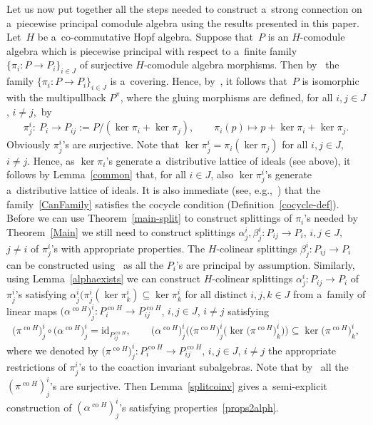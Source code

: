 \documentclass[11pt]{article}
\DeclareMathOperator{\co}{co}
\begin{document}
Let us now put together all the steps needed to construct a~strong connection on a~piecewise principal comodule algebra
using the results presented in this paper.
Let~$H$ be a~co-commutative Hopf algebra.
Suppose that~$P$ is an $H$-comodule algebra which is piecewise principal with respect to a~f\/inite family
$\{\pi_i:P\rightarrow P_i\}_{i\in J}$ of surjective $H$-comodule algebra morphisms.
Then by~\cite[Corollary~3.7]{hkmz11} the family $\{\pi_i:P\rightarrow P_i\}_{i\in J}$ is a~covering.
Hence, by~\cite[Proposition~3]{CM2000}, it follows that~$P$ is isomorphic with the multipullback $P^\pi$, where the
gluing morphisms are def\/ined, for all $i,j\in J$, $i\neq j$,~by
\begin{gather}
\label{CanFamily}
\pi^i_j: \ P_i\longrightarrow P_{ij}:=P/(\ker\pi_i+\ker\pi_j),
\qquad
\pi_i(p)\longmapsto p+\ker\pi_i+\ker\pi_j.
\end{gather}
Obviously $\pi^i_j$'s are surjective.
Note that $\ker\pi^i_j=\pi_i(\ker\pi_j)$ for all $i,j\in J$, $i\neq j$.
Hence, as $\ker\pi_i$'s generate a~distributive lattice of ideals (see above), it follows by Lemma~\ref{common} that,
for all $i\in J$, also $\ker\pi^i_j$'s generate a~distributive lattice of ideals.
It is also immediate (see, e.g.,~\cite[Remark~2]{CM2000}) that the family~\eqref{CanFamily} satisf\/ies the cocycle
condition (Def\/inition~\ref{cocycle-def}).
Before we can use Theorem~\ref{main-split} to construct splittings of $\pi_i$'s needed by Theorem~\ref{Main} we still
need to construct splittings $\alpha^i_j,\beta^i_j:P_{ij}\rightarrow P_i$, $i,j\in J$,
$j\neq i$ of $\pi^i_j$'s with appropriate properties.
The $H$-colinear splittings $\beta^i_j:P_{ij}\rightarrow P_i$ can be constructed using~\cite[Lemma~3.1]{hkmz11} as all
the $P_{i}$'s are principal by assumption.
Similarly, using Lemma~\ref{alphaexists} we can construct $H$-colinear splittings $\alpha^i_j:P_{ij}\rightarrow P_i$ of
$\pi^i_j$'s satisfying $\alpha^i_j(\pi^i_j(\ker{}\pi^i_k)\subseteq\ker\pi^i_k$ for all distinct $i,j,k\in J$ from
a~family of linear maps $\big(\alpha^{\co H}\big)^i_j:P_i^{\co H}\rightarrow P_{ij}^{\co H}$, $i,j\in J$, $i\neq j$ satisfying
\begin{gather}
\label{props2alph}
\big(\pi^{\co H}\big)^i_j\circ\big(\alpha^{\co H}\big)^i_j=\mathrm{id}_{P_{ij}^{\co H}},
\qquad
\big(\alpha^{\co H}\big)^i_j\big(\big(\pi^{\co H}\big)^i_j\big(\ker\big(\pi^{\co H}\big)^i_k\big)\big)\subseteq\ker\big(\pi^{\co H}\big)^i_k,
\end{gather}
where we denoted by $\big(\pi^{\co H}\big)^i_j:P_i^{\co H}\rightarrow P_{ij}^{\co H}$, $i,j\in J$, $i\neq j$
the appropriate restrictions of $\pi^i_j$'s to the coaction invariant subalgebras.
Note that by~\cite[Lemma~3.1]{hkmz11} all the $(\pi^{\co H})^i_j$'s are surjective.
Then Lemma~\ref{splitcoinv} gives a~semi-explicit construction of $(\alpha^{\co H})^i_j$'s satisfying properties~\eqref{props2alph}.
\end{document}
